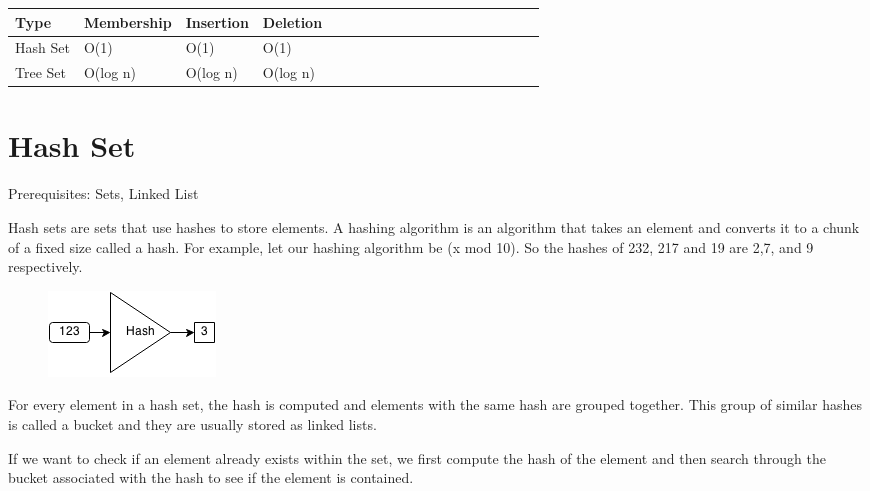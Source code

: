 \documentclass[11pt,oneside]{book}
\makeatletter
\def\maxwidth#1{\ifdim\Gin@nat@width>#1 #1\else\Gin@nat@width\fi}
\makeatother
\begin{document}
        

\begin{center}\begin{tabulary}{0.4\linewidth}{|l|l|l|l|l|l|l|l|l|l|l|l|l|l|l|l|l|l|l}\hline


  Type &
  Membership &
  Insertion &
  Deletion\\
\hline


  Hash Set &
  O(1) &
  O(1) &
  O(1)\\

  Tree Set &
  O(log n) &
  O(log n) &
  O(log n)\\

\hline\end{tabulary}\end{center}


        \section{ Hash Set }
        

Prerequisites: Sets, Linked List



Hash sets are sets that use hashes to store elements. A hashing algorithm is an algorithm that takes an element and converts it to a chunk of a fixed size called a hash. For example, let our hashing algorithm be (x mod 10). So the hashes of 232, 217 and 19 are 2,7, and 9 respectively.

\vspace{5px}\begin{figure}[H]\centering
        \includegraphics[width=0.66\maxwidth{\textwidth}]{hashcode.png}
        \end{figure}

For every element in a hash set, the hash is computed and elements with the same hash are grouped together. This group of similar hashes is called a bucket and they are usually stored as linked lists.

If we want to check if an element already exists within the set, we first compute the hash of the element and then search through the bucket associated with the hash to see if the element is contained.
\end{document}

